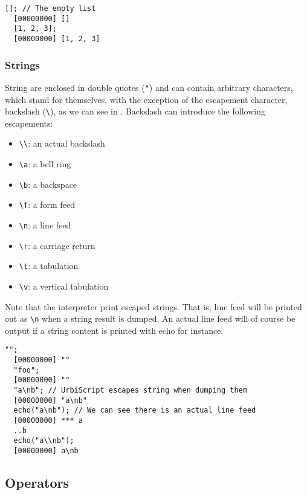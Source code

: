 \documentclass[openright,twoside,12pt]{report}
\begin{document}
\begin{lstlisting}[caption=Literal lists,label=lst:literal-lists,float=\floatpos]
  []; // The empty list
  [00000000] []
  [1, 2, 3];
  [00000000] [1, 2, 3]
\end{lstlisting}

\subsubsection{Strings}

String are enclosed in double quotes (\lstinline|"|) and can contain
arbitrary characters, which stand for themselves, with the exception
of the escapement character, backslash (\lstinline|\|), as we can see
in . Backslash can introduce the following escapements:

\begin{itemize}
  \item \lstinline |\\|: an actual backslash
  \item \lstinline|\a|: a bell ring
  \item \lstinline|\b|: a backspace
  \item \lstinline|\f|: a form feed
  \item \lstinline|\n|: a line feed
  \item \lstinline|\r|: a carriage return
  \item \lstinline|\t|: a tabulation
  \item \lstinline|\v|: a vertical tabulation
\end{itemize}

Note that the interpreter print escaped strings. That is, line feed
will be printed out as \lstinline|\n| when a string result is
dumped. An actual line feed will of course be output if a string
content is printed with echo for instance.

\begin{lstlisting}[caption=Literal strings,label=lst:literal-strings,float=\floatpos]
  "";
  [00000000] ""
  "foo";
  [00000000] ""
  "a\nb"; // UrbiScript escapes string when dumping them
  [00000000] "a\nb"
  echo("a\nb"); // We can see there is an actual line feed
  [00000000] *** a
  ..b
  echo("a\\nb");
  [00000000] a\nb
\end{lstlisting}

\subsection{Operators}
\end{document}
